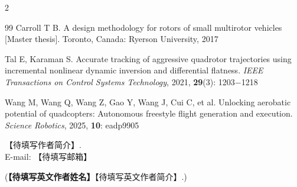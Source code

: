 \documentclass{aas}
\begin{document}
\begin{multicols}{2}
\begin{thebibliography}{99}
 Carroll T B. A design methodology for rotors of small multirotor vehicles [Master thesis]. Toronto, Canada: Ryerson University, 2017

 Tal E, Karaman S. Accurate tracking of aggressive quadrotor trajectories using incremental nonlinear dynamic inversion and differential flatness. {\sl IEEE Transactions on Control Systems Technology}, 2021, {\bf 29}(3): 1203$-$1218

 Wang M, Wang Q, Wang Z, Gao Y, Wang J, Cui C, et al. Unlocking aerobatic potential of quadcopters: Autonomous freestyle flight generation and execution. {\sl Science Robotics}, 2025, {\bf 10}: eadp9905

\end{thebibliography}

\begin{biographynophoto}
\quad 【待填写作者简介】.\\E-mail: 【待填写邮箱】

\noindent({\bf 【待填写英文作者姓名】}\quad 【待填写英文作者简介】.)
\end{biographynophoto}

\end{multicols}
\end{document}
